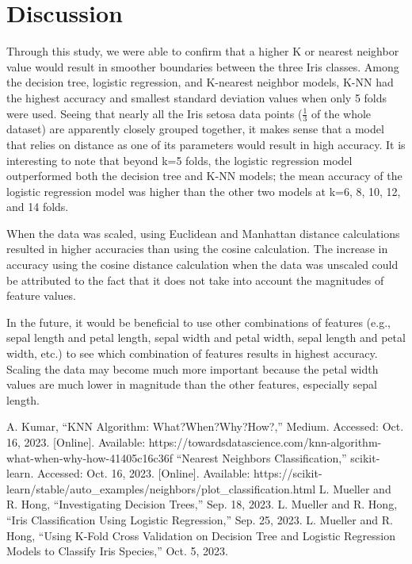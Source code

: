 \documentclass[journal]{IEEEtran}
\begin{document}
\section{Discussion}
Through this study, we were able to confirm that a higher K or nearest neighbor value would result in smoother boundaries between the three Iris classes.  Among the decision tree, logistic regression, and K-nearest neighbor models, K-NN had the highest accuracy and smallest standard deviation values when only 5 folds were used. Seeing that nearly all the Iris setosa data points (\(\frac{1}{3}\) of the whole dataset) are apparently closely grouped together, it makes sense that a model that relies on distance as one of its parameters would result in high accuracy. It is interesting to note that beyond k=5 folds, the logistic regression model outperformed both the decision tree and K-NN models; the mean accuracy of the logistic regression model was higher than the other two models at k=6, 8, 10, 12, and 14 folds.

When the data was scaled, using Euclidean and Manhattan distance calculations resulted in higher accuracies than using the cosine calculation. The increase in accuracy using the cosine distance calculation when the data was unscaled could be attributed to the fact that it does not take into account the magnitudes of feature values. 

In the future, it would be beneficial to use other combinations of features (e.g., sepal length and petal length, sepal width and petal width, sepal length and petal width, etc.) to see which combination of features results in highest accuracy. Scaling the data may become much more important because the petal width values are much lower in magnitude than the other features, especially sepal length.

\newpage 

\begin{thebibliography}{00}
A. Kumar, “KNN Algorithm: What?When?Why?How?,” Medium. Accessed: Oct. 16, 2023. [Online]. Available: https://towardsdatascience.com/knn-algorithm-what-when-why-how-41405c16c36f
“Nearest Neighbors Classification,” scikit-learn. Accessed: Oct. 16, 2023. [Online]. Available: https://scikit-learn/stable/auto\_examples/neighbors/plot\_classification.html
L. Mueller and R. Hong, “Investigating Decision Trees,” Sep. 18, 2023.
L. Mueller and R. Hong, “Iris Classification Using Logistic Regression,” Sep. 25, 2023.
L. Mueller and R. Hong, “Using K-Fold Cross Validation on Decision Tree and Logistic Regression Models to Classify Iris Species,” Oct. 5, 2023.

\end{thebibliography}
\end{document}
